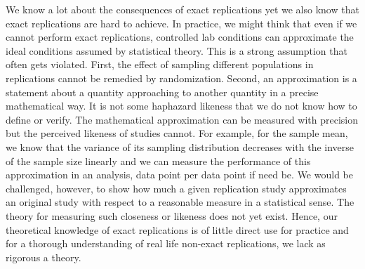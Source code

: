 \documentclass[meta,authordate,issue]{jote-new-article}
\begin{document}
We know a lot about the consequences of exact replications yet we also know that exact replications are hard to achieve. In practice, we might think that even if we cannot perform exact replications, controlled lab conditions can approximate the ideal conditions assumed by statistical theory. This is a strong assumption that often gets violated. First, the effect of sampling different populations in replications cannot be remedied by randomization. Second, an approximation is a statement about a quantity approaching to another quantity in a precise mathematical way. It is not some haphazard likeness that we do not know how to define or verify. The mathematical approximation can be measured with precision but the perceived likeness of studies cannot. For example, for the sample mean, we know that the variance of its sampling distribution decreases with the inverse of the sample size linearly and we can measure the performance of this approximation in an analysis, data point per data point if need be. We would be challenged, however, to show how much a given replication study approximates an original study with respect to a reasonable measure in a statistical sense. The theory for measuring such closeness or likeness does not yet exist. Hence, our theoretical knowledge of exact replications is of little direct use for practice and for a thorough understanding of real life non-exact replications, we lack as rigorous a theory.




\end{document}
